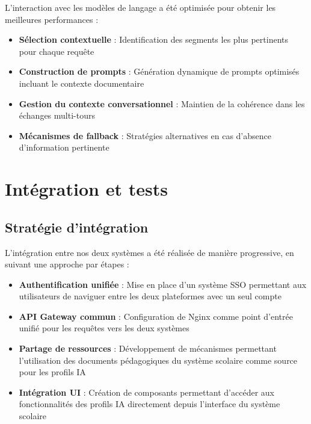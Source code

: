 L'interaction avec les modèles de langage a été optimisée pour obtenir les meilleures performances :

\begin{itemize}
  \item \textbf{Sélection contextuelle} : Identification des segments les plus pertinents pour chaque requête
  
  \item \textbf{Construction de prompts} : Génération dynamique de prompts optimisés incluant le contexte documentaire
  
  \item \textbf{Gestion du contexte conversationnel} : Maintien de la cohérence dans les échanges multi-tours
  
  \item \textbf{Mécanismes de fallback} : Stratégies alternatives en cas d'absence d'information pertinente
\end{itemize}

\section{Intégration et tests}

\subsection{Stratégie d'intégration}

L'intégration entre nos deux systèmes a été réalisée de manière progressive, en suivant une approche par étapes :

\begin{itemize}
  \item \textbf{Authentification unifiée} : Mise en place d'un système SSO permettant aux utilisateurs de naviguer entre les deux plateformes avec un seul compte
  
  \item \textbf{API Gateway commun} : Configuration de Nginx comme point d'entrée unifié pour les requêtes vers les deux systèmes
  
  \item \textbf{Partage de ressources} : Développement de mécanismes permettant l'utilisation des documents pédagogiques du système scolaire comme source pour les profils IA
  
  \item \textbf{Intégration UI} : Création de composants permettant d'accéder aux fonctionnalités des profils IA directement depuis l'interface du système scolaire
\end{itemize}

